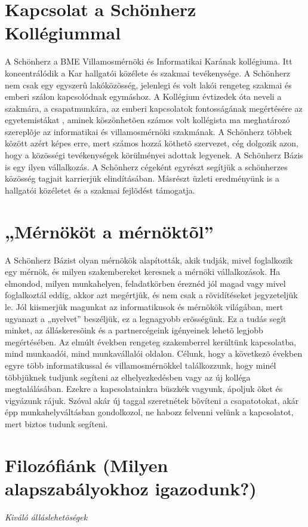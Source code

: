 \documentclass[a4paper]{article}
\begin{document}
\section{Kapcsolat a Schönherz Kollégiummal}
A Schönherz a BME Villamosmérnöki és Informatikai Karának kollégiuma. Itt koncentrálódik a Kar hallgatói közélete és szakmai tevékenysége. A Schönherz nem csak egy egyszerû lakóközösség, jelenlegi és volt lakói rengeteg szakmai és emberi szálon kapcsolódnak egymáshoz. A Kollégium évtizedek óta neveli a szak\-mára, a csapatmunkára, az emberi kapcsolatok fontosságának megértésére az egyetemistákat , aminek köszönhetõen számos volt kollégista ma meghatározó szereplõje az informatikai és villamosmérnöki szakmának. A Schönherz többek között azért képes erre, mert számos hozzá köthetõ szervezet, cég dolgozik azon, hogy a közösségi tevékenységek körülményei adottak legyenek. A Schönherz Bázis is egy ilyen vállalkozás. A Schönherz cégeként egyrészt segítjük a schönherzes közösség tagjait karrierjük elindításában. Másrészt üzleti eredményünk is a hallgatói közéletet és a szakmai fejlõdést támogatja.
\section{„Mérnököt a mérnöktõl”}
A Schönherz Bázist olyan mérnökök alapították, akik tudják, mivel foglalkozik egy mérnök, és milyen szakembereket keresnek a mérnöki vállalkozások. Ha elmondod, milyen munkahelyen, feladatkörben éreznéd jól magad vagy mivel foglalkoztál eddig, akkor azt megértjük, és nem csak a rövidítéseket jegyzeteljük le. Jól kiismerjük magunkat az informatikusok és mérnökök világában, mert ugyanazt a „nyelvet” beszéljük, ez a legnagyobb erõsségünk. Ez a tudás segít minket, az álláskeresõink és a partnercégeink igényeinek lehetõ legjobb megértésében. Az elmúlt években rengeteg szakemberrel kerültünk kapcsolatba, mind munkaadói, mind munkavállalói oldalon. Célunk, hogy a következõ években egyre több informatikussal és villamosmérnökkel találkozzunk, hogy minél többjüknek tudjunk segíteni az elhelyezkedésben vagy az új kolléga megtalálásában. Ezekre a kapcsolatainkra büszkék vagyunk, ápoljuk õket és vigyázunk rájuk. Szóval akár új taggal szeretnétek bõvíteni a csapatotokat, akár épp munkahelyváltásban gondolkozol, ne habozz felvenni velünk a kapcsolatot, mert biztos tudunk segíteni.
\section{Filozófiánk (Milyen alapszabályokhoz igazodunk?)}
\textit{Kiváló álláslehetõségek}
\end{document}
